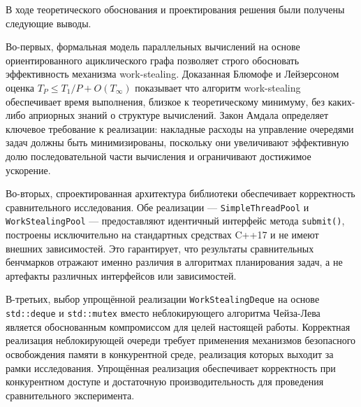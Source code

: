 В ходе теоретического обоснования и проектирования решения
были получены следующие выводы.

Во-первых, формальная модель параллельных вычислений на основе
ориентированного ациклического графа позволяет строго обосновать
эффективность механизма work-stealing. Доказанная Блюмофе
и Лейзерсоном оценка $T_P \leq T_1 / P + O(T_\infty)$
показывает что алгоритм work-stealing обеспечивает время
выполнения, близкое к теоретическому минимуму, без каких-либо
априорных знаний о структуре вычислений. Закон Амдала определяет
ключевое требование к реализации: накладные расходы на управление
очередями задач должны быть минимизированы, поскольку они
увеличивают эффективную долю последовательной части вычисления
и ограничивают достижимое ускорение.

Во-вторых, спроектированная архитектура библиотеки обеспечивает
корректность сравнительного исследования. Обе реализации ---
\texttt{SimpleThreadPool} и \texttt{WorkStealingPool} ---
предоставляют идентичный интерфейс метода \texttt{submit()},
построены исключительно на стандартных средствах C++17
и не имеют внешних зависимостей. Это гарантирует, что результаты
сравнительных бенчмарков отражают именно различия в алгоритмах
планирования задач, а не артефакты различных интерфейсов
или зависимостей.

В-третьих, выбор упрощённой реализации \texttt{WorkStealingDeque}
на основе \texttt{std::deque} и \texttt{std::mutex} вместо
неблокирующего алгоритма Чейза-Лева является обоснованным
компромиссом для целей настоящей работы. Корректная реализация
неблокирующей очереди требует применения механизмов безопасного
освобождения памяти в конкурентной среде, реализация которых
выходит за рамки исследования. Упрощённая реализация обеспечивает
корректность при конкурентном доступе и достаточную
производительность для проведения сравнительного эксперимента.